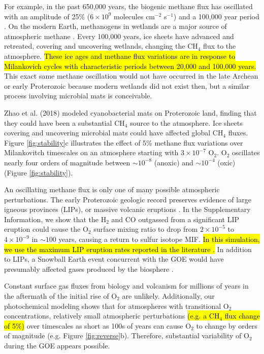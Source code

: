 \documentclass[9pt,twocolumn,twoside,lineno]{pnas-new}
\begin{document}
For example, in the past 650,000 years, the biogenic methane flux has oscillated with an amplitude of 25\% ($6 \times 10^9$ molecules cm$^{-2}$ s$^{-1}$) and a 100,000 year period \cite{Hopcroft_2018,Spahni_2005}. On the modern Earth, methanogens in wetlands are a major source of atmospheric methane \cite{Canadell_2021}. Every 100,000 years, ice sheets have advanced and retreated, covering and uncovering wetlands, changing the CH$_4$ flux to the atmosphere. \hl{These ice ages and methane flux variations are in response to Milankovich cycles with characteristic periods between 20,000 and 100,000 years.} This exact same methane oscillation would not have occurred in the late Archean or early Proterozoic because modern wetlands did not exist then, but a similar process involving microbial mats is conceivable. 

Zhao et al. (2018) \cite{Zhao_2018} modeled cyanobacterial mats on Proterozoic land, finding that they could have been a substantial CH$_4$ source to the atmosphere. Ice sheets covering and uncovering microbial mats could have affected global CH$_4$ fluxes. Figure \ref{fig:stability}c illustrates the effect of 5\% methane flux variations over Milankovitch timescales on an atmosphere starting with $3\times 10^{-7}$ O$_2$. O$_2$ oscillates nearly four orders of magnitude between $\sim10^{-8}$ (anoxic) and $\sim10^{-4}$ (oxic) (Figure \ref{fig:stability}).

An oscillating methane flux is only one of many possible atmospheric perturbations. The early Proterozoic geologic record preserves evidence of large igneous provinces (LIPs), or massive volcanic eruptions \cite{Gumsley_2017}. In the Supplementary Information, we show that the H$_2$ and CO outgassed from a significant LIP eruption could cause the O$_2$ surface mixing ratio to drop from $2 \times 10^{-5}$ to $4 \times 10^{-9}$ in $\sim100$ years, causing a return to sulfur isotope MIF. \hl{In this simulation, we use the maximum LIP eruption rates reported in the literature \mbox{\cite{Bryan_2010}}.} In addition to LIPs, a Snowball Earth event concurrent with the GOE would have presumably affected gases produced by the biosphere \cite{Rasmussen_2013}.

Constant surface gas fluxes from biology and volcanism for millions of years in the aftermath of the initial rise of O$_2$ are unlikely. Additionally, our photochemical modeling shows that for atmospheres with transitional O$_2$ concentrations, relatively small atmospheric perturbations \hl{(e.g. a CH$_4$ flux change of 5\%)} over timescales as short as 100s of years can cause O$_2$ to change by orders of magnitude (e.g. Figure \ref{fig:reverse}b). Therefore, substantial variability of O$_2$ during the GOE appears possible.
\end{document}
